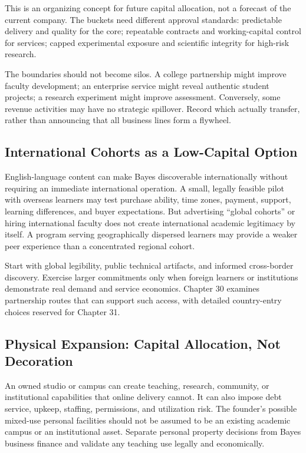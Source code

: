 This is an organizing concept for future capital allocation, not a forecast of the current company. The buckets need different approval standards: predictable delivery and quality for the core; repeatable contracts and working-capital control for services; capped experimental exposure and scientific integrity for high-risk research.

The boundaries should not become silos. A college partnership might improve faculty development; an enterprise service might reveal authentic student projects; a research experiment might improve assessment. Conversely, some revenue activities may have no strategic spillover. Record which actually transfer, rather than announcing that all business lines form a flywheel.

\subsection{International Cohorts as a Low-Capital Option}
\label{sec:international_cohorts_low_capital_option}

English-language content can make Bayes discoverable internationally without requiring an immediate international operation. A small, legally feasible pilot with overseas learners may test purchase ability, time zones, payment, support, learning differences, and buyer expectations. But advertising ``global cohorts'' or hiring international faculty does not create international academic legitimacy by itself. A program serving geographically dispersed learners may provide a weaker peer experience than a concentrated regional cohort.

Start with global legibility, public technical artifacts, and informed cross-border discovery. Exercise larger commitments only when foreign learners or institutions demonstrate real demand and service economics. Chapter 30 examines partnership routes that can support such access, with detailed country-entry choices reserved for Chapter 31.

\subsection{Physical Expansion: Capital Allocation, Not Decoration}
\label{sec:physical_expansion_capital_allocation}

An owned studio or campus can create teaching, research, community, or institutional capabilities that online delivery cannot. It can also impose debt service, upkeep, staffing, permissions, and utilization risk. The founder's possible mixed-use personal facilities should not be assumed to be an existing academic campus or an institutional asset. Separate personal property decisions from Bayes business finance and validate any teaching use legally and economically.

